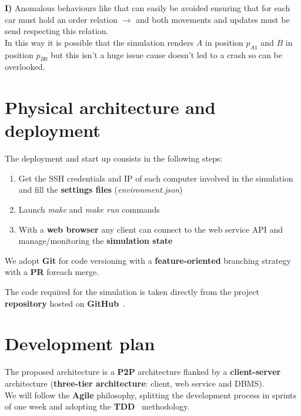 \begin{tcolorbox}
\textbf{I)} Anomalous behaviours like that can easily be avoided ensuring that 
for each car must hold an order relation $\rightarrow$ and both movements 
and updates must be send respecting this relation.\\

In this way it is possible 
that the simulation renders $A$ in position $p_{A1}$ and $B$ in position 
$p_{B0}$ but this isn't a huge issue cause doesn't led to a crash so 
can be overlooked.
\end{tcolorbox}


\section{Physical architecture and deployment}

The deployment and start up consists in the following steps:
\begin{enumerate}
    \item Get the SSH credentials and IP of each computer involved in the simulation and 
        fill the \textbf{settings files} (\textit{environment.json})
    \item Launch \textit{make} and \textit{make run} commands 
    \item With a \textbf{web browser} any client can connect to the web service API and 
        manage/monitoring the \textbf{simulation state}   
\end{enumerate}

\noindent
We adopt \textbf{Git} for code versioning with a \textbf{feature-oriented} 
branching strategy with a \textbf{PR} foreach merge.

The code required for the simulation is taken directly from the project 
\textbf{repository} hosted on \textbf{GitHub}~\cite{2}.


\section{Development plan}

The proposed architecture is a \textbf{P2P} architecture flanked by a 
\textbf{client-server} architecture (\textbf{three-tier architecture}: 
client, web service and DBMS).\\

We will follow the \textbf{Agile} philosophy, splitting the development process in sprints 
of one week and adopting the \textbf{TDD}~\cite{10} methodology.